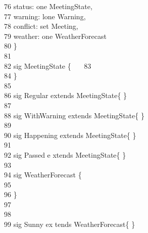 \-    \ 76      \qquad \-\qquad status: {\color{blue}one} MeetingState,\\
\-    \ 77      \qquad \-\qquad warning: {\color{blue}lone} Warning,\\
\-    \ 78      \qquad \-\qquad conflict: {\color{blue}set} Meeting,\\
\-    \ 79      \qquad \-\qquad weather: {\color{blue}one} WeatherForecast\\
\-    \ 80      \qquad \} \\
\-    \ 81      \qquad \\
\-    \ 82       {\color{blue}sig} MeetingState \{\                                                 \
\-    \ 83      \qquad  \\
\-    \ 84      \qquad \}\\
\-    \ 85      \qquad \\
\-    \ 86       {\color{blue}sig} Regular {\color{blue}                                                 extends} MeetingState\{ \}\\
\-    \ 87      \qquad \\
\-    \ 88       {\color{blue}sig} WithWarning {\color{b                                                 lue}extends} MeetingState\{ \}\\
\-    \ 89      \qquad \\
\-    \ 90       {\color{blue}sig} Happening {\color{blu                                                 e}extends} MeetingState\{ \}\\
\-    \ 91      \qquad \\
\-    \ 92       {\color{blue}sig} Passed {\color{blue}e                                                 xtends} MeetingState\{ \}\\
\-    \ 93      \qquad \\
\-    \ 94       {\color{blue}sig} WeatherForecast                                                  \{\\
\-    \ 95      \qquad \\
\-    \ 96      \qquad \}\\
\-    \ 97      \qquad \\
\-    \ 98      \\
\-    \ 99      \qquad {\color{blue}one} {\color{blue}sig} Sunny {\color{blue}ex                                                 tends} WeatherForecast\{ \}\\
